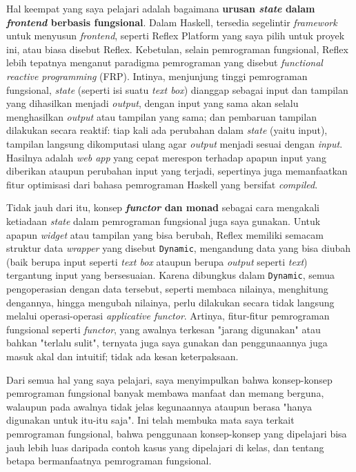 \documentclass{article}
\begin{document}
Hal keempat yang saya pelajari adalah bagaimana \textbf{urusan \textit{state} dalam \textit{frontend} berbasis fungsional}. Dalam Haskell, tersedia segelintir \textit{framework} untuk menyusun \textit{frontend}, seperti Reflex Platform yang saya pilih untuk proyek ini, atau biasa disebut Reflex. Kebetulan, selain pemrograman fungsional, Reflex lebih tepatnya menganut paradigma pemrograman yang disebut \textit{functional reactive programming} (FRP). Intinya, menjunjung tinggi pemrograman fungsional, \textit{state} (seperti isi suatu \textit{text box}) dianggap sebagai input dan tampilan yang dihasilkan menjadi \textit{output}, dengan input yang sama akan selalu menghasilkan \textit{output} atau tampilan yang sama; dan pembaruan tampilan dilakukan secara reaktif: tiap kali ada perubahan dalam \textit{state} (yaitu input), tampilan langsung dikomputasi ulang agar \textit{output} menjadi sesuai dengan \textit{input}. Hasilnya adalah \textit{web app} yang cepat merespon terhadap apapun input yang diberikan ataupun perubahan input yang terjadi, sepertinya juga memanfaatkan fitur optimisasi dari bahasa pemrograman Haskell yang bersifat \textit{compiled}.

Tidak jauh dari itu, konsep \textbf{\textit{functor} dan monad} sebagai cara mengakali ketiadaan \textit{state} dalam pemrograman fungsional juga saya gunakan. Untuk apapun \textit{widget} atau tampilan yang bisa berubah, Reflex memiliki semacam struktur data \textit{wrapper} yang disebut \verb|Dynamic|, mengandung data yang bisa diubah (baik berupa input seperti \textit{text box} ataupun berupa \textit{output} seperti \textit{text}) tergantung input yang bersesuaian. Karena dibungkus dalam \verb|Dynamic|, semua pengoperasian dengan data tersebut, seperti membaca nilainya, menghitung dengannya, hingga mengubah nilainya, perlu dilakukan secara tidak langsung melalui operasi-operasi \textit{applicative functor}. Artinya, fitur-fitur pemrograman fungsional seperti \textit{functor}, yang awalnya terkesan "jarang digunakan" atau bahkan "terlalu sulit", ternyata juga saya gunakan dan penggunaannya juga masuk akal dan intuitif; tidak ada kesan keterpaksaan.

Dari semua hal yang saya pelajari, saya menyimpulkan bahwa konsep-konsep pemrograman fungsional banyak membawa manfaat dan memang berguna, walaupun pada awalnya tidak jelas kegunaannya ataupun berasa "hanya digunakan untuk itu-itu saja". Ini telah membuka mata saya terkait pemrograman fungsional, bahwa penggunaan konsep-konsep yang dipelajari bisa jauh lebih luas daripada contoh kasus yang dipelajari di kelas, dan tentang betapa bermanfaatnya pemrograman fungsional.
\end{document}
